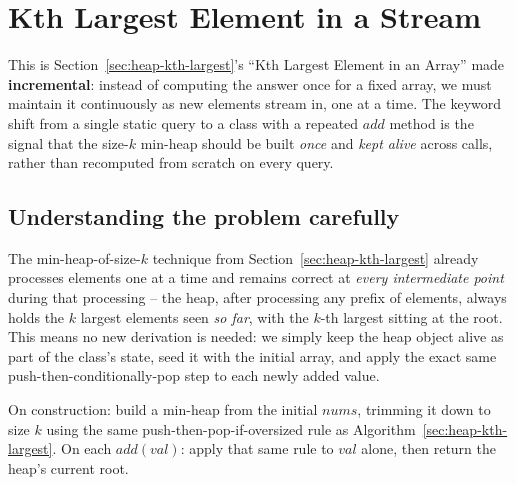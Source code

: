 \section{Kth Largest Element in a Stream}
\label{sec:heap-kth-largest-stream}


\begin{patternbox}
This is Section~\ref{sec:heap-kth-largest}'s ``Kth Largest Element in an
Array'' made \textbf{incremental}: instead of computing the answer once
for a fixed array, we must maintain it continuously as new elements
stream in, one at a time. The keyword shift from a single static query to
a class with a repeated $\textit{add}$ method is the signal that the
size-$k$ min-heap should be built \emph{once} and \emph{kept alive}
across calls, rather than recomputed from scratch on every query.
\end{patternbox}

\subsection*{Understanding the problem carefully}

The min-heap-of-size-$k$ technique from
Section~\ref{sec:heap-kth-largest} already processes elements one at a
time and remains correct at \emph{every intermediate point} during that
processing -- the heap, after processing any prefix of elements, always
holds the $k$ largest elements seen \emph{so far}, with the $k$-th largest
sitting at the root. This means no new derivation is needed: we simply
keep the heap object alive as part of the class's state, seed it with the
initial array, and apply the exact same push-then-conditionally-pop step
to each newly added value.

\begin{ideabox}
On construction: build a min-heap from the initial $\textit{nums}$,
trimming it down to size $k$ using the same push-then-pop-if-oversized
rule as Algorithm~\ref{sec:heap-kth-largest}. On each $\textit{add}(val)$:
apply that same rule to $\textit{val}$ alone, then return the heap's
current root.
\end{ideabox}


